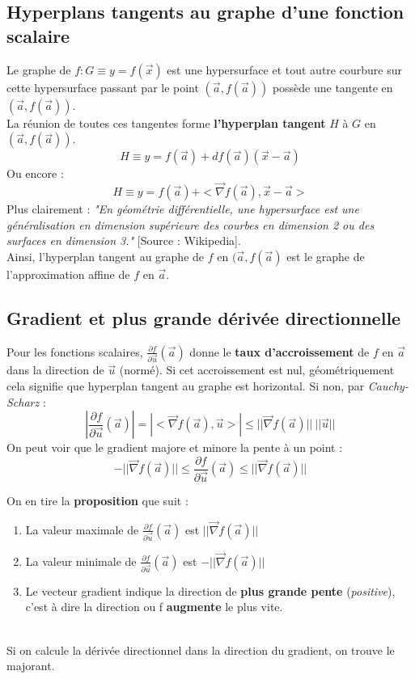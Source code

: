 \documentclass[11pt, a4paper, openany]{book}
\begin{document}
\subsection{Hyperplans tangents au graphe d'une fonction scalaire}
Le graphe de $f : G \equiv y = f(\vec{x})$ est une hypersurface et tout autre courbure sur cette hypersurface passant par le point $(\vec{a},f(\vec{a}))$ possède une tangente en $(\vec{a},f(\vec{a}))$.\\
La réunion de toutes ces tangentes forme \textbf{l'hyperplan tangent} $H$ à $G$ en $(\vec{a},f(\vec{a}))$.
$$H \equiv y = f(\vec{a}) + df(\vec{a})(\vec{x} - \vec{a})$$
Ou encore : 
$$H \equiv y = f(\vec{a}) + <\vec{\nabla}f(\vec{a}), \vec{x} - \vec{a}>$$
Plus clairement : \textit{"En géométrie différentielle, une hypersurface est une généralisation en dimension supérieure des courbes en dimension 2 ou des surfaces en dimension 3."} [Source : Wikipedia].\\

Ainsi, l'hyperplan tangent au graphe de $f$ en $(\vec{a}, f(\vec{a})$ est le graphe de l'approximation affine de $f$ en $\vec{a}$.

\subsection{Gradient et plus grande dérivée directionnelle}
Pour les fonctions scalaires, $\frac{\partial f}{\partial\vec{u}}(\vec{a})$ donne le \textbf{taux d'accroissement} de $f$ en $\vec{a}$ dans la direction de $\vec{u}$ (normé). Si cet accroissement est nul, géométriquement cela signifie que hyperplan tangent au graphe est horizontal. Si non, par \textit{Cauchy-Scharz} :
$$|\frac{\partial f}{\partial\vec{u}}(\vec{a})| = |<\vec{\nabla}f(\vec{a}), \vec{u}>| \leq ||\vec{\nabla}f(\vec{a})||\ ||\vec{u}||$$
On peut voir que le gradient majore et minore la pente à un point :
$$- ||\vec{\nabla}f(\vec{a})|| \leq \frac{\partial f}{\partial\vec{u}}(\vec{a}) \leq ||\vec{\nabla}f(\vec{a})||$$

On en tire la \textbf{proposition} que suit : 
\begin{enumerate}
	\item La valeur maximale de $\frac{\partial f}{\partial\vec{u}}(\vec{a})$ est $||\vec{\nabla}f(\vec{a})||$
	\item La valeur minimale de $\frac{\partial f}{\partial\vec{u}}(\vec{a})$ est $-||\vec{\nabla}f(\vec{a})||$
	\item Le vecteur gradient indique la direction de \textbf{plus grande pente} (\textit{positive}), c'est à dire la direction ou f \textbf{augmente} le plus vite.
\end{enumerate}
\ \\
Si on calcule la dérivée directionnel dans la direction du gradient, on trouve le majorant.
\end{document}
